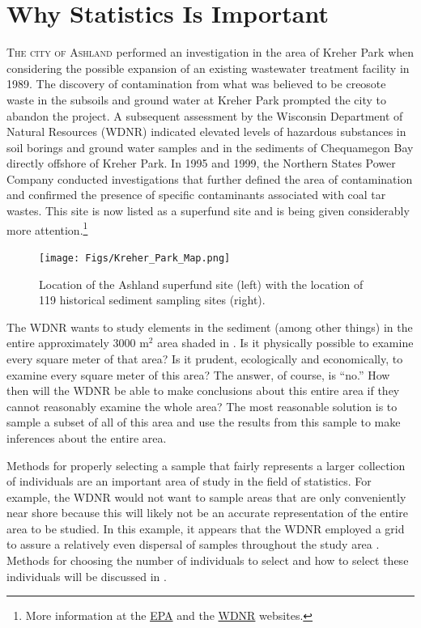 \documentclass[10pt,openany]{book}\usepackage[]{graphicx}\usepackage[]{color}
\begin{document}
\section{Why Statistics Is Important}\label{sect:WhyStats}
\lettrine{T}{he city of Ashland} performed an investigation in the area of Kreher Park  when considering the possible expansion of an existing wastewater treatment facility in 1989.  The discovery of contamination from what was believed to be creosote waste in the subsoils and ground water at Kreher Park prompted the city to abandon the project. A subsequent assessment by the Wisconsin Department of Natural Resources (WDNR) indicated elevated levels of hazardous substances in soil borings and ground water samples and in the sediments of Chequamegon Bay directly offshore of Kreher Park.  In 1995 and 1999, the Northern States Power Company conducted investigations that further defined the area of contamination and confirmed the presence of specific contaminants associated with coal tar wastes.  This site is now listed as a superfund site and is being given considerably more attention.\footnote{More information at the \href{https://cumulis.epa.gov/supercpad/cursites/csitinfo.cfm?id=0507952}{EPA} and the \href{http://dnr.wi.gov/topic/brownfields/ashland.html}{WDNR} websites.}

\begin{figure}[htbp]
  \centering
    \texttt{[image: Figs/Kreher\_Park\_Map.png]}
  \caption{Location of the Ashland superfund site (left) with the location of 119 historical sediment sampling sites (right).}
  \label{fig:KreherParkMap}
\end{figure}

The WDNR wants to study elements in the sediment (among other things) in the entire approximately 3000 m$^2$ area shaded in .  Is it physically possible to examine every square meter of that area?  Is it prudent, ecologically and economically, to examine every square meter of this area?  The answer, of course, is ``no.''  How then will the WDNR be able to make conclusions about this entire area if they cannot reasonably examine the whole area?  The most reasonable solution is to sample a subset of all of this area and use the results from this sample to make inferences about the entire area.

Methods for properly selecting a sample that fairly represents a larger collection of individuals are an important area of study in the field of statistics.  For example, the WDNR would not want to sample areas that are only conveniently near shore because this will likely not be an accurate representation of the entire area to be studied.  In this example, it appears that the WDNR employed a grid to assure a relatively even dispersal of samples throughout the study area .  Methods for choosing the number of individuals to select and how to select these individuals will be discussed in .
\end{document}
